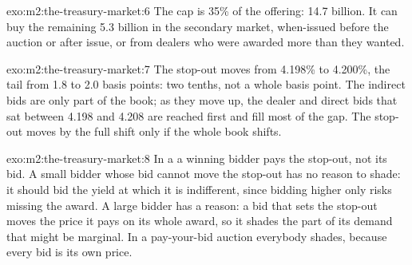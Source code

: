 \begin{solution}{exo:m2:the-treasury-market:6}
The cap is 35\% of the offering: 14.7 billion. It can buy the remaining 5.3
billion in the secondary market, when-issued before the auction or after
issue, or from dealers who were awarded more than they wanted.
\end{solution}

\begin{solution}{exo:m2:the-treasury-market:7}
The stop-out moves from 4.198\% to 4.200\%, the tail from 1.8 to 2.0 basis
points: two tenths, not a whole basis point. The indirect bids are only part
of the book; as they move up, the dealer and direct bids that sat between
4.198 and 4.208 are reached first and fill most of the gap. The stop-out moves
by the full shift only if the whole book shifts.
\end{solution}

\begin{solution}{exo:m2:the-treasury-market:8}
In a  a winning bidder pays the stop-out, not its bid. A
small bidder whose bid cannot move the stop-out has no reason to shade: it
should bid the yield at which it is indifferent, since bidding higher only
risks missing the award. A large bidder has a reason: a bid that sets the
stop-out moves the price it pays on its whole award, so it shades the part of
its demand that might be marginal. In a pay-your-bid auction everybody shades,
because every bid is its own price.
\end{solution}

